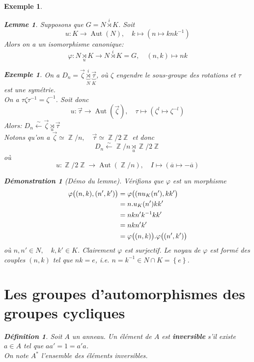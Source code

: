 \documentclass[a4paper, oneside]{report}
\theoremstyle{break}
\newtheorem{lemme}[thm]{Lemme}
\newtheorem{definition}[thm]{Définition}
\newtheorem{exemple}[thm]{Exemple}
\newtheorem*{demonstration}{Démonstration}
\DeclareMathOperator{\Z}{\mathbb{Z}}
\DeclarePairedDelimiter\ens{\left\{ }{\right\} }%
\DeclarePairedDelimiter\pa{\big(}{\big)}%
\DeclareMathOperator{\Aut}{Aut}
\renewcommand{\ens}[1]{\left\{ #1 \right\} }%
\newcommand{\slign}{\textbf}
\newcommand{\us}{\underset}
\newcommand{\os}{\overset}
\newcommand{\ol}{\overline}
\newcommand{\ub}{\underbrace}
\begin{document}
\begin{exemple}
\begin{lemme}
Supposons que $G = N \os{i}{\rtimes} K$. Soit
\[
u : K \rightarrow \Aut(N), \quad	k \mapsto (n \mapsto k n k^{-1})
\]
Alors on a un isomorphisme canonique:
\[
\varphi : N \us{u}{\rtimes} K \rightarrow N \os{i}{\rtimes} K = G, \quad	(n,k) \mapsto nk
\]
\end{lemme}

\begin{exemple}
On a $D_n = \vec{\zeta} \ub{\os{i}{\rtimes}}_{N} \ub{\vec{\tau}}_{K}$, où $\zeta$ engendre le sous-groupe des rotations et $\tau$ est une symétrie.\\
On a $\tau\zeta\tau^{-1} = \zeta^{-1}$. Soit donc 
\[
u : \vec{\tau} \rightarrow \Aut(\vec{\zeta}), \quad	\tau \mapsto (\zeta^l \mapsto \zeta^{-l})
\]
Alors: $D_n \os{\sim}{\leftarrow} \vec{\zeta} \us{u}{\rtimes} \vec{\tau}$\\
Notons qu'on a $\vec{\zeta} \simeq \Z/n, \quad	\vec{\tau} \simeq \Z/2\Z$ et donc 
\[
D_n \os{\sim}{\leftarrow} \Z/n \us{u}{\rtimes} \Z/2\Z
\]
où
\[
u : \Z/2\Z \rightarrow \Aut(\Z/n), \quad	I \mapsto (\ol{a} \mapsto -\ol{a})
\]
\end{exemple}

\begin{demonstration}[Démo du lemme]
Vérifions que $\varphi$ est un morphisme
\begin{align*}
\varphi \pa{(n, k), (n', k')} &= \varphi\pa{(n u_K(n'), kk'} 
\\
&= n . u_K(n') kk' 
\\
&= nkn'k^{-1}kk' 
\\
&= nkn'k'
\\
&= \varphi\pa{(n,k)} . \varphi\pa{(n', k')}
\end{align*}
où $n, n' \in N, \quad k, k' \in K$. Clairement $\varphi$ est surjectif. Le noyau de $\varphi$ est formé des couples $(n, k)$ tel que $nk = e$, i.e. $n = k^{-1} \in N \cap K = \ens{e}$.
\end{demonstration}

\section{Les groupes d'automorphismes des groupes cycliques}

\begin{definition}
Soit $A$ un anneau. Un élément de $A$ est \slign{inversible} s'il existe $a \in A$ tel que $aa' = 1 = a'a$.\\
On note $A^*$ l'ensemble des éléments inversibles.
\end{definition}


\end{exemple}
\end{document}
